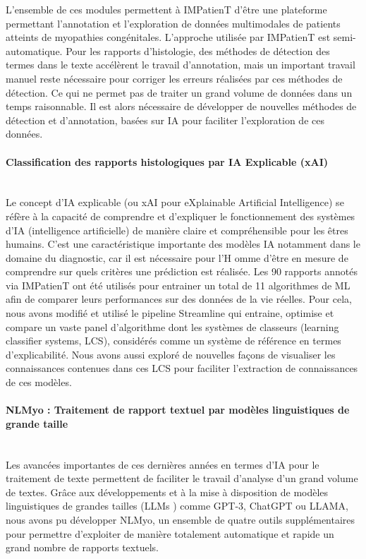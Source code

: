 L’ensemble de ces modules permettent à IMPatienT d’être une plateforme permettant l’annotation et l’exploration de données multimodales de patients atteints de myopathies congénitales. L’approche utilisée par IMPatienT est semi-automatique. Pour les rapports d’histologie, des méthodes de détection des termes dans le texte accélèrent le travail d’annotation, mais un important travail manuel reste nécessaire pour corriger les erreurs réalisées par ces méthodes de détection. Ce qui ne permet pas de traiter un grand volume de données dans un temps raisonnable. Il est alors nécessaire de développer de nouvelles méthodes de détection et d’annotation, basées sur IA pour faciliter l’exploration de ces données.

\paragraph{\textbf{Classification des rapports histologiques par IA Explicable (xAI)}}\mbox{}\\

Le concept d’IA explicable (ou xAI pour eXplainable Artificial Intelligence) se réfère à la capacité de comprendre et d’expliquer le fonctionnement des systèmes d’IA (intelligence artificielle) de manière claire et compréhensible pour les êtres humains. C’est une caractéristique importante des modèles IA notamment dans le domaine du diagnostic, car il est nécessaire pour l’H omme d’être en mesure de comprendre sur quels critères une prédiction est réalisée. Les 90 rapports annotés via IMPatienT ont été utilisés pour entrainer un total de 11 algorithmes de ML afin de comparer leurs performances sur des données de la vie réelles. Pour cela, nous avons modifié et utilisé le pipeline Streamline qui entraine, optimise et compare un vaste panel d’algorithme dont les systèmes de classeurs (learning classifier systems, LCS),  considérés comme un système de référence en termes d’explicabilité. Nous avons aussi exploré de nouvelles façons de visualiser les connaissances contenues dans ces LCS pour faciliter l’extraction de connaissances de ces modèles.

\paragraph{\textbf{NLMyo : Traitement de rapport textuel par modèles linguistiques de grande taille}}\mbox{}\\

Les avancées importantes de ces dernières années en termes d’IA pour le traitement de texte permettent de faciliter le travail d’analyse d’un grand volume de textes. Grâce aux développements et à la mise à disposition de modèles linguistiques de grandes tailles (LLMs ) comme GPT-3, ChatGPT ou LLAMA, nous avons pu développer NLMyo, un ensemble de quatre outils supplémentaires pour permettre d’exploiter de manière totalement automatique et rapide un grand nombre de rapports textuels.

